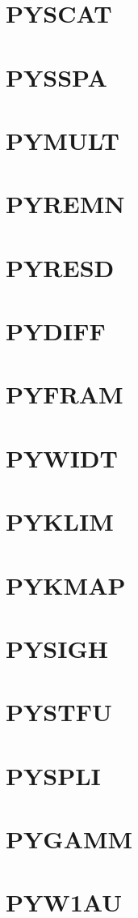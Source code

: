 \documentclass[14pt,UTF8]{ctexbook}
\begin{document}
\section{PYSCAT}
\section{PYSSPA}
\section{PYMULT}
\section{PYREMN}
\section{PYRESD}
\section{PYDIFF}
\section{PYFRAM}
\section{PYWIDT}
\section{PYKLIM}
\section{PYKMAP}
\section{PYSIGH}
\section{PYSTFU}
\section{PYSPLI}
\section{PYGAMM}
\section{PYW1AU}
\end{document}
